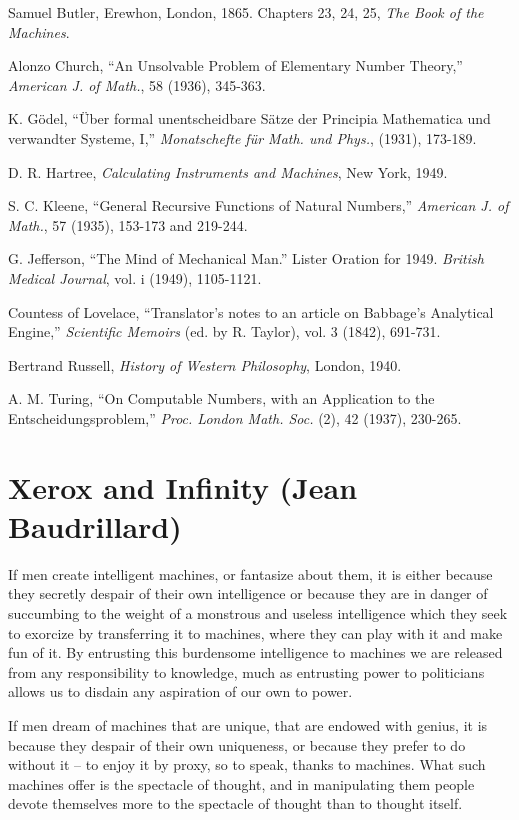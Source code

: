 \documentclass[10pt,twoside,openany]{memoir}
\begin{document}
\begin{hangparas}{1.5em}{1}

Samuel Butler, Erewhon, London, 1865. Chapters 23, 24, 25, \emph{The Book of the Machines}.

Alonzo Church, ``An Unsolvable Problem of Elementary Number Theory,'' \emph{American J. of Math.}, 58 (1936), 345-363.

K. G\"odel, ``\"Uber formal unentscheidbare S\"atze der Principia Mathematica und verwandter Systeme, I,'' \emph{Monatschefte f\"ur Math. und Phys.}, (1931), 173-189.

D. R. Hartree, \emph{Calculating Instruments and Machines}, New York, 1949.

S. C. Kleene, ``General Recursive Functions of Natural Numbers,'' \emph{American J. of Math.}, 57 (1935), 153-173 and 219-244.

G. Jefferson, ``The Mind of Mechanical Man.'' Lister Oration for 1949. \emph{British Medical Journal}, vol. i (1949), 1105-1121.

Countess of Lovelace, ``Translator's notes to an article on Babbage's Analytical Engine,'' \emph{Scientific Memoirs} (ed. by R. Taylor), vol. 3 (1842), 691-731.

Bertrand Russell, \emph{History of Western Philosophy}, London, 1940.

A. M. Turing, ``On Computable Numbers, with an Application to the Entscheidungsproblem,'' \emph{Proc. London Math. Soc.} (2), 42 (1937), 230-265.
\end{hangparas}


\chapter{Xerox and Infinity (Jean Baudrillard)}

If men create intelligent machines, or fantasize about them, it is either because they secretly despair of their own intelligence or because they are in danger of succumbing to the weight of a monstrous and useless intelligence which they seek to exorcize by transferring it to machines, where they can play with it and make fun of it. By entrusting this burdensome intelligence to machines we are released from any responsibility to knowledge, much as entrusting power to politicians allows us to disdain any aspiration of our own to power.

If men dream of machines that are unique, that are endowed with genius, it is because they despair of their own uniqueness, or because they prefer to do without it -- to enjoy it by proxy, so to speak, thanks to machines. What such machines offer is the spectacle of thought, and in manipulating them people devote themselves more to the spectacle of thought than to thought itself. 
\end{document}
